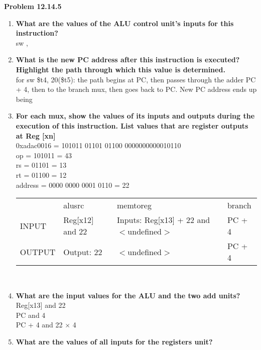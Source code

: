\documentclass{article}
\begin{document}
    \textbf{Problem 12.14.5}
    \begin{enumerate}[label=(\alph*)]
        \item \textbf{What are the values of the ALU control unit's inputs for this instruction?}\\
        sw , 
        \item \textbf{What is the new PC address after this instruction is executed? Highlight the path through which this value is determined.}\\
        for sw \$t4, 20(\$t5): the path begins at PC, then passes through the adder PC + 4, then to the branch mux, then goes back to PC. New PC address ends up being 
        \item \textbf{For each mux, show the values of its inputs and outputs during the execution of this instruction. List values that are register outputs at Reg [xn]}\\
        0xadac0016 = 101011 01101 01100 0000000000010110\\
        op = 101011 = 43\\
        rs = 01101 = 13\\
        rt = 01100 = 12\\
        address = 0000 0000 0001 0110 = 22\\[0.25in]
        \begin{tabular}{l | l | l | l}
            & alusrc & memtoreg & branch\\
            INPUT& Reg[x12] and 22& Inputs: Reg[x13] + 22 and $<$undefined$>$ & PC + 4\\
            OUTPUT& Output: 22&  $<$undefined$>$ & PC + 4
        \end{tabular}\\[0.25in]
        \item \textbf{What are the input values for the ALU and the two add units?}\\
         Reg[x13] and 22\\
         PC and 4\\
         PC + 4 and 22 $\times$ 4
        \item \textbf{What are the values of all inputs for the registers unit?}
    \end{enumerate}
\end{document}
